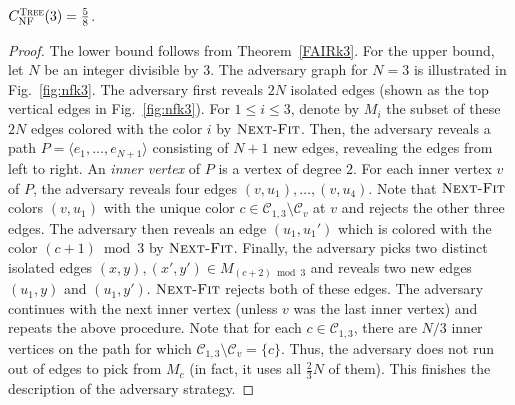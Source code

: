 \documentclass[smallextended]{svjour3}
\newcommand{\NF}{\ensuremath{\operatorname{\textsc{Next-Fit}}}\xspace}
\DeclareMathOperator{\NFm}{NF}
\begin{document}
\begin{theorem}
\label{NFk3}
 $C_{\NFm}^{\text{{\sc Tree}}}(3)=\frac{5}{8}$.
\end{theorem}
\begin{proof}
The lower bound follows from Theorem~\ref{FAIRk3}.
For the upper bound, let $N$ be an integer divisible by $3$. 
The adversary graph for $N=3$ is illustrated in Fig.~\ref{fig:nfk3}.
The adversary first reveals $2N$ isolated edges (shown as the top vertical edges in Fig.~\ref{fig:nfk3}). 
For $1 \leq i \leq 3$, denote by $M_i$ the subset of these $2N$ edges colored with the color $i$ by \NF. Then, the adversary reveals a path $P=\langle e_1,\ldots , e_{N+1}\rangle$ consisting of $N+1$ new edges, revealing the edges from left to right. An \emph{inner vertex} of $P$ is a vertex of degree $2$. For each inner vertex $v$ of $P$, the adversary reveals four edges $(v,u_1),\ldots , (v,u_4)$. Note that \NF colors $(v,u_1)$ with the unique color $c\in \mathcal{C}_{1,3}\setminus \mathcal{C}_v$ at $v$ and rejects the other three edges. The adversary then reveals an edge $(u_1, u_1')$ which is colored with the color $(c+1) \bmod 3$ by \NF. Finally, the adversary picks two distinct isolated edges $(x,y),(x',y')\in M_{(c+2) \bmod 3}$ and reveals two new edges $(u_1, y)$ and $(u_1, y')$. \NF rejects both of these edges. The adversary continues with the next inner vertex (unless $v$ was the last inner vertex) and repeats the above procedure. Note that for each $c\in \mathcal{C}_{1,3}$, there are $N/3$ inner vertices on the path for which $\mathcal{C}_{1,3}\setminus \mathcal{C}_v=\{c\}$. Thus, the adversary does not run out of edges to pick from $M_c$ (in fact, it uses all $\frac{2}{3}N$ of them). This finishes the description of the adversary strategy. 


\end{proof}
\end{document}
